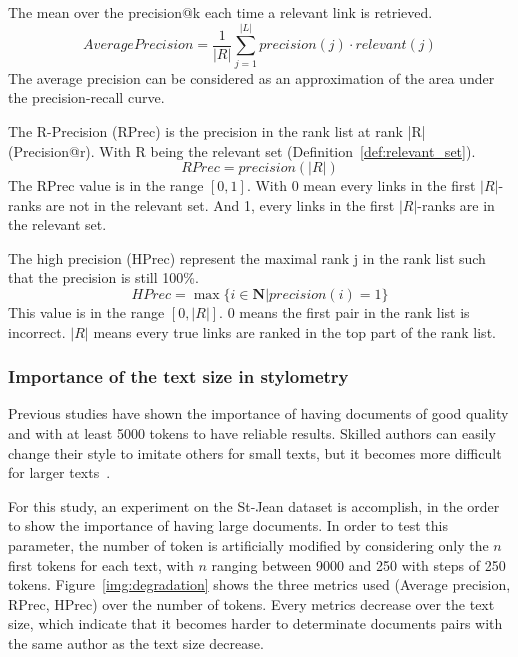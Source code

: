 \begin{definition}
  The mean over the precision@k each time a relevant link is retrieved.
  \begin{equation}
    AveragePrecision = \frac{1}{|R|} \sum_{j=1}^{|L|} precision(j) \cdot relevant(j)
  \end{equation}
  The average precision can be considered as an approximation of the area under the precision-recall curve.
\end{definition}

\begin{definition}
  The R-Precision (RPrec) is the precision in the rank list at rank |R| (Precision@r).
  With R being the relevant set (Definition~\ref{def:relevant_set}).
  \begin{equation}
    RPrec = precision(|R|)
  \end{equation}
  The RPrec value is in the range $\left[0, 1\right]$.
  With 0 mean every links in the first $|R|$-ranks are not in the relevant set.
  And 1, every links in the first $|R|$-ranks are in the relevant set.
\end{definition}

\begin{definition}
  The high precision (HPrec) represent the maximal rank j in the rank list such that the precision is still 100\%.
  \begin{equation}
    HPrec = \max\{i \in \mathbf{N} | precision(i) = 1\}
  \end{equation}
  This value is in the range $\left[0, |R|\right]$.
  $0$ means the first pair in the rank list is incorrect.
  $|R|$ means every true links are ranked in the top part of the rank list.
\end{definition}

\subsubsection{Importance of the text size in stylometry}

Previous studies have shown the importance of having documents of good quality and with at least 5000 tokens to have reliable results.
Skilled authors can easily change their style to imitate others for small texts, but it becomes more difficult for larger texts~\cite{savoy_stylo}.

For this study, an experiment on the St-Jean dataset is accomplish, in the order to show the importance of having large documents.
In order to test this parameter, the number of token is artificially modified by considering only the $n$ first tokens for each text, with $n$ ranging between 9000 and 250 with steps of 250 tokens.
Figure~\ref{img:degradation} shows the three metrics used (Average precision, RPrec, HPrec) over the number of tokens.
Every metrics decrease over the text size, which indicate that it becomes harder to determinate documents pairs with the same author as the text size decrease.

